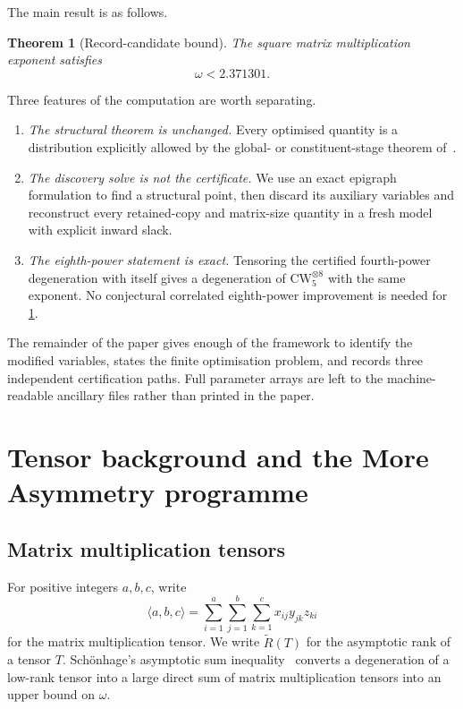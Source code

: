 \documentclass[11pt,reqno]{amsart}
\newtheorem{theorem}{Theorem}[section]
\theoremstyle{definition}
\theoremstyle{remark}
\newcommand{\CW}{\mathrm{CW}}
\newcommand{\Rbar}{\widetilde{R}}
\begin{document}
The main result is as follows.

\begin{theorem}[Record-candidate bound]\label{thm:main}
  The square matrix multiplication exponent satisfies
  \[
     \omega<2.371301.
  \]
\end{theorem}

Three features of the computation are worth separating.

\begin{enumerate}[leftmargin=2.2em]
  \item \emph{The structural theorem is unchanged.}  Every optimised quantity is a distribution
  explicitly allowed by the global- or constituent-stage theorem of~\cite{MoreAsymmetry}.
  \item \emph{The discovery solve is not the certificate.}  We use an exact epigraph formulation to find
  a structural point, then discard its auxiliary variables and reconstruct every retained-copy and matrix-size
  quantity in a fresh model with explicit inward slack.
  \item \emph{The eighth-power statement is exact.}  Tensoring the certified fourth-power degeneration
  with itself gives a degeneration of $\CW_5^{\otimes8}$ with the same exponent.  No conjectural
  correlated eighth-power improvement is needed for \cref{thm:main}.
\end{enumerate}

The remainder of the paper gives enough of the framework to identify the modified variables, states the
finite optimisation problem, and records three independent certification paths.  Full parameter arrays are
left to the machine-readable ancillary files rather than printed in the paper.

\section{Tensor background and the More Asymmetry programme}

\subsection{Matrix multiplication tensors}

For positive integers $a,b,c$, write
\[
  \langle a,b,c\rangle
  =\sum_{i=1}^{a}\sum_{j=1}^{b}\sum_{k=1}^{c}x_{ij}y_{jk}z_{ki}
\]
for the matrix multiplication tensor.  We write $\Rbar(T)$ for the asymptotic rank of a tensor $T$.
Sch\"onhage's asymptotic sum inequality~\cite{Schonhage1981} converts a degeneration of a low-rank
tensor into a large direct sum of matrix multiplication tensors into an upper bound on $\omega$.
\end{document}
